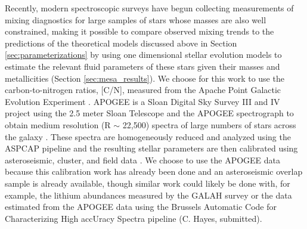 

Recently, modern spectroscopic surveys have begun collecting measurements of mixing diagnostics for large samples of stars whose masses are also well constrained, making it possible to compare %
{observed mixing trends}
to the predictions of the 
theoretical models discussed above in Section \ref{sec:parameterizations} by using one dimensional stellar evolution models to estimate the relevant fluid parameters of these stars given their masses and metallicities (Section \ref{sec:mesa_results}). 
%
We choose for this work to use the carbon-to-nitrogen ratios, {[C/N],} measured from the Apache Point Galactic Evolution Experiment \citep[APOGEE, ][]{Majewski2015,Majewski2017}. APOGEE is a Sloan Digital Sky Survey III and IV \citep{Blanton2017} project using the 2.5 meter Sloan Telescope \citep{Gunn2006} and the APOGEE spectrograph \citep{Wilson2019} to obtain medium resolution (R $\sim$ 22,500) spectra of large numbers of stars across the galaxy \citep{Zasowski2017, Beaton2021,Santana2021}. These spectra are homogeneously reduced and analyzed using the ASPCAP pipeline \citep{Nidever2015, Zamora2015, GarciaPerez2016} and the resulting stellar parameters are then calibrated using asteroseismic, cluster, and field data \citep{Holtzman2015,Holtzman2018, Jonsson2020}. We choose to use the APOGEE data because this calibration work has already been done and an asteroseismic overlap sample is already available, though %
similar work could likely be done with, for example, the lithium abundances measured by the GALAH survey \citep{buder2019} or the \ctwelvecthirteen data estimated from the APOGEE data using the Brussels Automatic Code
for Characterizing High accUracy Spectra \citep[BACCHUS,][]{Masseron2016_BACCHUS} pipeline (C. Hayes, submitted). 

